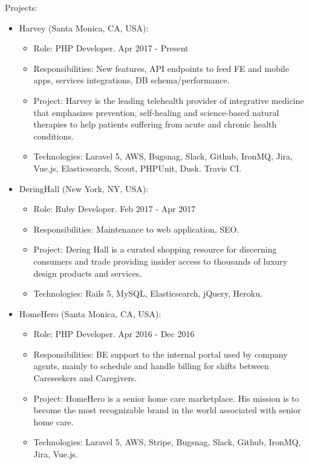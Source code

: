 \documentclass[11pt,a4paper,sans]{moderncv}        %
\begin{document}
  {
    Projects:\\
    \begin{itemize}
      \item Harvey (Santa Monica, CA, USA):
        \begin{itemize}
          \item Role: PHP Developer. Apr 2017 - Present
          \item Responsibilities: New features, API endpoints to feed FE and mobile apps, services integrations, DB schema/performance.
          \item Project: Harvey is the leading telehealth provider of integrative medicine that emphasizes prevention, self-healing and science-based natural therapies to help patients suffering from acute and chronic health conditions.
          \item Technologies: Laravel 5, AWS, Bugsnag, Slack, Github, IronMQ, Jira, Vue.js, Elasticsearch, Scout, PHPUnit, Dusk. Travis CI.
        \end{itemize}
      \item DeringHall (New York, NY, USA):
        \begin{itemize}
          \item Role: Ruby Developer. Feb 2017 - Apr 2017
          \item Responsibilities: Maintenance to web application, SEO.
          \item Project: Dering Hall is a curated shopping resource for discerning consumers and trade providing insider access to thousands of luxury design products and services.
          \item Technologies: Rails 5, MySQL, Elasticsearch, jQuery, Heroku.
        \end{itemize}
      \item HomeHero (Santa Monica, CA, USA):
        \begin{itemize}
          \item Role: PHP Developer. Apr 2016 - Dec 2016
          \item Responsibilities: BE support to the internal portal used by company agents, mainly to schedule and handle billing for shifts between Careseekers and Caregivers.
          \item Project: HomeHero is a senior home care marketplace. His mission is to become the most recognizable brand in the world associated with senior home care.
          \item Technologies: Laravel 5, AWS, Stripe, Bugsnag, Slack, Github, IronMQ, Jira, Vue.js.
        \end{itemize}
    \end{itemize}
  }
\end{document}
